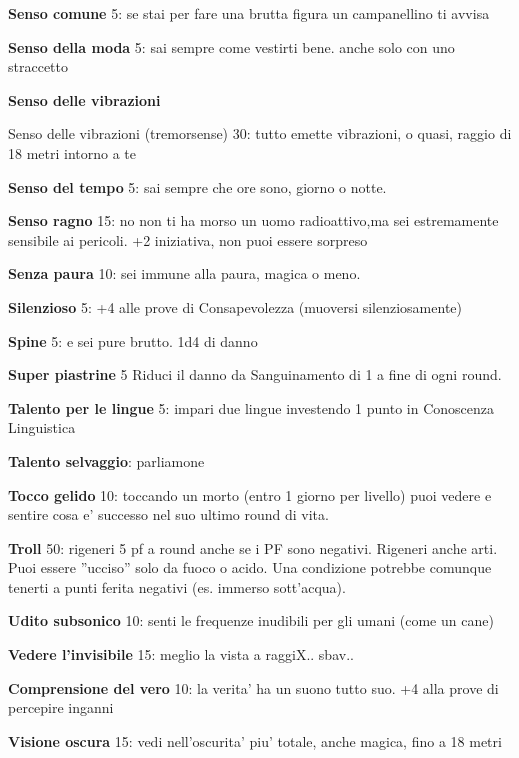 \documentclass[a4paper,11pt,twoside,openany]{book}
\begin{document}
\textbf{Senso comune} 5: se stai per fare una brutta figura un campanellino ti avvisa

\textbf{Senso della moda} 5: sai sempre come vestirti bene. anche solo con uno straccetto

\textbf{Senso delle vibrazioni} {Senso delle vibrazioni  (tremorsense) 30: tutto emette vibrazioni, o quasi, raggio di 18 metri intorno a te

\textbf{Senso del tempo} 5: sai sempre che ore sono, giorno o notte.

\textbf{Senso ragno} 15: no non ti ha morso un uomo radioattivo,ma sei estremamente sensibile ai pericoli. +2 iniziativa, non puoi essere sorpreso

\textbf{Senza paura} 10: sei immune alla paura, magica o meno.

\textbf{Silenzioso} 5: +4 alle prove di Consapevolezza (muoversi silenziosamente)

\textbf{Spine} 5: e sei pure brutto. 1d4 di danno

\textbf{Super piastrine} 5 Riduci il danno da Sanguinamento di 1 a fine di ogni round.

\textbf{Talento per le lingue} 5: impari due lingue investendo 1 punto in Conoscenza Linguistica

\textbf{Talento selvaggio}: parliamone

\textbf{Tocco gelido} 10: toccando un morto (entro 1 giorno per livello) puoi vedere e sentire cosa e' successo nel suo ultimo round di vita.

\textbf{Troll} 50: rigeneri 5 pf a round anche se i PF sono negativi. Rigeneri anche arti. Puoi essere ''ucciso'' solo da fuoco o acido. Una condizione potrebbe comunque tenerti a punti ferita negativi (es. immerso sott'acqua).

\textbf{Udito subsonico} 10: senti le frequenze inudibili per gli umani (come un cane)

\textbf{Vedere l'invisibile} 15: meglio la vista a raggiX.. sbav..

\textbf{Comprensione del vero} 10: la verita' ha un suono tutto suo. +4 alla prove di percepire inganni

\textbf{Visione oscura} 15: vedi nell'oscurita' piu' totale, anche magica, fino a 18 metri

}
\end{document}
